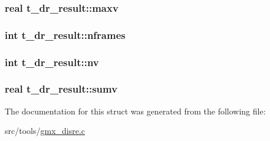 \hypertarget{structt__dr__result_a07f7551662a100546fe802b03a774e80}{
\subsubsection[{maxv}]{\setlength{\rightskip}{0pt plus 5cm}real {\bf t\-\_\-dr\-\_\-result\-::maxv}}}\label{structt__dr__result_a07f7551662a100546fe802b03a774e80}
\hypertarget{structt__dr__result_aeb76b6d85904ad5e934747493402d194}{
\subsubsection[{nframes}]{\setlength{\rightskip}{0pt plus 5cm}int {\bf t\-\_\-dr\-\_\-result\-::nframes}}}\label{structt__dr__result_aeb76b6d85904ad5e934747493402d194}
\hypertarget{structt__dr__result_a23c6dca12d4b01b26db442aa2dfb4756}{
\subsubsection[{nv}]{\setlength{\rightskip}{0pt plus 5cm}int {\bf t\-\_\-dr\-\_\-result\-::nv}}}\label{structt__dr__result_a23c6dca12d4b01b26db442aa2dfb4756}
\hypertarget{structt__dr__result_a0df41a86398264fd8dc860bf07c4f36f}{
\subsubsection[{sumv}]{\setlength{\rightskip}{0pt plus 5cm}real {\bf t\-\_\-dr\-\_\-result\-::sumv}}}\label{structt__dr__result_a0df41a86398264fd8dc860bf07c4f36f}


\-The documentation for this struct was generated from the following file\-:\begin{DoxyCompactItemize}
\item 
src/tools/\hyperlink{gmx__disre_8c}{gmx\-\_\-disre.\-c}\end{DoxyCompactItemize}
